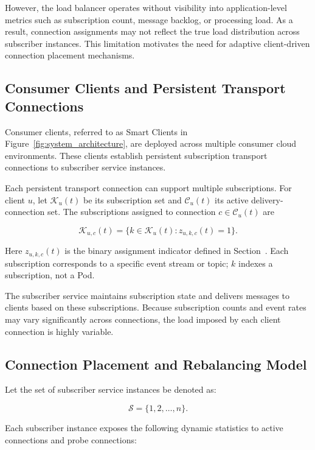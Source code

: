 However, the load balancer operates without visibility into application-level metrics such as subscription count, message backlog, or processing load. As a result, connection assignments may not reflect the true load distribution across subscriber instances.
This limitation motivates the need for adaptive client-driven connection placement mechanisms.

\subsection{Consumer Clients and Persistent Transport Connections}

Consumer clients, referred to as Smart Clients in Figure~\ref{fig:system_architecture}, are deployed across multiple consumer cloud environments. These clients establish persistent subscription transport connections to subscriber service instances.

Each persistent transport connection can support multiple subscriptions. For
client $u$, let $\mathcal{K}_u(t)$ be its subscription set and
$\mathcal{C}_u(t)$ its active delivery-connection set. The subscriptions
assigned to connection $c\in\mathcal{C}_u(t)$ are

\begin{equation}
	\mathcal{K}_{u,c}(t)=\{k\in\mathcal{K}_u(t):z_{u,k,c}(t)=1\}.
\end{equation}

Here $z_{u,k,c}(t)$ is the binary assignment indicator defined in
Section~. Each subscription corresponds to a
specific event stream or topic; $k$ indexes a subscription, not a Pod.

The subscriber service maintains subscription state and delivers messages to clients based on these subscriptions.
Because subscription counts and event rates may vary significantly across connections, the load imposed by each client connection is highly variable.

\subsection{Connection Placement and Rebalancing Model}

Let the set of subscriber service instances be denoted as:

\begin{equation}
	\mathcal{S}=\{1,2,\ldots,n\}.
\end{equation}

Each subscriber instance exposes the following dynamic statistics to active
connections and probe connections:

